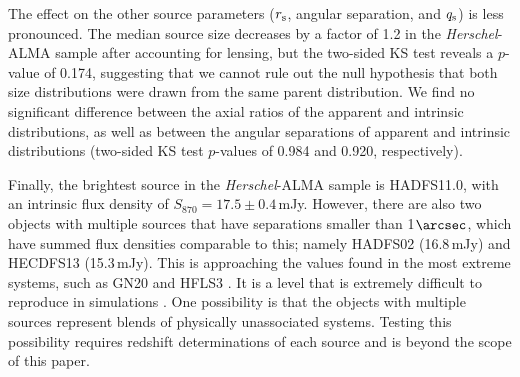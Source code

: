 \documentclass[iop]{emulateapj}
\begin{document}
The effect on the other source parameters ($r_{\rm s}$, angular separation, and
$q_{\rm s}$) is less pronounced.  The median source size decreases by a factor
of 1.2 in the {\it Herschel}-ALMA sample after accounting for lensing, but the
two-sided KS test reveals a $p$-value of 0.174, suggesting that we cannot rule
out the null hypothesis that both size distributions were drawn from the same
parent distribution.  We find no significant difference between the axial
ratios of the apparent and intrinsic distributions, as well as between the
angular separations of apparent and intrinsic distributions (two-sided KS test
$p$-values of 0.984 and 0.920, respectively). 


Finally, the brightest source in the {\it Herschel}-ALMA sample is
HADFS11.0, with an intrinsic flux density of $S_{870} = 17.5 \pm 0.4\,$mJy.
However, there are also two objects with multiple sources that have separations
smaller than 1$\arcsec$, which have summed flux densities comparable to this;
namely HADFS02 (16.8$\,$mJy) and HECDFS13 (15.3$\,$mJy).  This is approaching
the values found in the most extreme systems, such as GN20
\citep[20.6$\,$mJy,][]{2006MNRAS.370.1185P} and HFLS3
\citep[15-20$\,$mJy;][]{Riechers:2013lr, Cooray:2014rm, Robson:2014xy}.  It is
a level that is extremely difficult to reproduce in simulations
\citep[e.g.,][]{Narayanan:2010lr}.  One possibility is that the objects with
multiple sources represent blends of physically unassociated systems.  Testing
this possibility requires redshift determinations of each source and is beyond
the scope of this paper.
\end{document}
